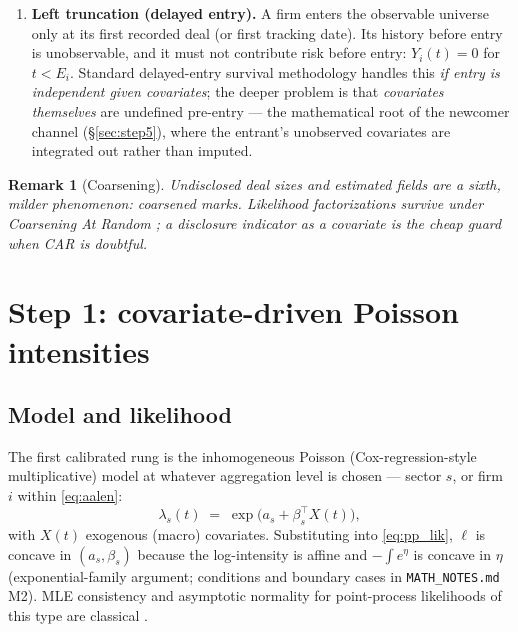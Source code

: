 \documentclass[11pt]{article}
\newcommand{\code}[1]{\texttt{#1}}
\newtheorem{remark}{Remark}
\numberwithin{assumption}{section}
\numberwithin{proposition}{section}
\numberwithin{remark}{section}
\begin{document}
\begin{enumerate}[leftmargin=1.6em]
Poisson GLM on counts (\S\ref{sec:step1}). For history-dependent models the
collapse is not exact, and what is lost is quantifiable Fisher information
about timescales (\S\ref{sec:step4}); for the full Hawkes case the
counts-only route is the interval-censored theory of \citet{rizoiu2022}.
\item \textbf{Left truncation (delayed entry).} A firm enters the observable
universe only at its first recorded deal (or first tracking date). Its
history before entry is unobservable, and it must not contribute risk before
entry: $Y_i(t)=0$ for $t<E_i$. Standard delayed-entry survival methodology
\citep{kalbfleisch2002} handles this \emph{if entry is independent given
covariates}; the deeper problem is that \emph{covariates themselves} are
undefined pre-entry --- the mathematical root of the newcomer channel
(\S\ref{sec:step5}), where the entrant's unobserved covariates are
integrated out rather than imputed.
\end{enumerate}

\begin{remark}[Coarsening]
Undisclosed deal sizes and estimated fields are a sixth, milder phenomenon:
\emph{coarsened} marks. Likelihood factorizations survive under Coarsening
At Random \citep{heitjan1991}; a disclosure indicator as a covariate is the
cheap guard when CAR is doubtful.
\end{remark}

\section{Step 1: covariate-driven Poisson intensities}
\label{sec:step1}

\subsection{Model and likelihood}
The first calibrated rung is the inhomogeneous Poisson (Cox-regression-style
multiplicative) model at whatever aggregation level is chosen --- sector
$s$, or firm $i$ within \eqref{eq:aalen}:
\begin{equation}
\lambda_s(t)\;=\;\exp\!\big(a_s+\beta_s^{\top}X(t)\big),
\label{eq:nhpp}
\end{equation}
with $X(t)$ exogenous (macro) covariates. Substituting into
\eqref{eq:pp_lik}, $\ell$ is concave in $(a_s,\beta_s)$ because the
log-intensity is affine and $-\int e^{\eta}$ is concave in $\eta$
(exponential-family argument; conditions and boundary cases in
\code{MATH\_NOTES.md} M2). MLE consistency and asymptotic normality for
point-process likelihoods of this type are classical \citep{ogata1978}.
\end{document}
